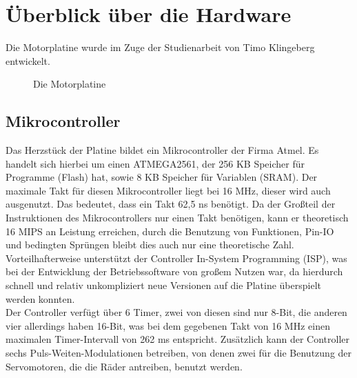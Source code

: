 \chapter{Überblick über die Hardware}

Die Motorplatine wurde im Zuge der Studienarbeit von Timo Klingeberg \cite{STUD_TIMO}
entwickelt.
\begin{figure}[htb]
 \centering
 \caption{\label{board}Die Motorplatine}
\end{figure}
\section{Mikrocontroller}
Das Herzstück der Platine bildet ein Mikrocontroller der Firma Atmel.
Es handelt sich hierbei um einen ATMEGA2561\cite{ATMEGA_MANUAL}, der 256 KB Speicher für
Programme (Flash) hat, sowie 8 KB Speicher für Variablen (SRAM). Der maximale Takt für
diesen Mikrocontroller liegt bei 16 MHz, dieser wird auch ausgenutzt. Das bedeutet, dass
ein Takt 62,5 ns benötigt. Da der Großteil der Instruktionen des Mikrocontrollers nur
einen Takt benötigen, kann er theoretisch 16 MIPS an Leistung erreichen, durch die Benutzung
von Funktionen, Pin-IO und bedingten Sprüngen bleibt dies auch nur eine theoretische Zahl.
Vorteilhafterweise unterstützt der Controller In-System Programming (ISP), was bei der
Entwicklung der Betriebssoftware von großem Nutzen war, da hierdurch schnell und relativ
unkompliziert neue Versionen auf die Platine überspielt werden konnten.\\
Der Controller verfügt über 6 Timer, zwei von diesen sind nur 8-Bit, die anderen vier allerdings
haben 16-Bit, was bei dem gegebenen Takt von 16 MHz einen maximalen Timer-Intervall von 262 ms
entspricht. Zusätzlich kann der Controller sechs Puls-Weiten-Modulationen betreiben, von
denen zwei für die Benutzung der Servomotoren, die die Räder antreiben, benutzt werden.
